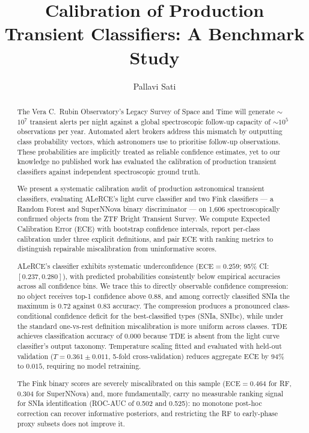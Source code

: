 \documentclass[twocolumn]{aastex631}
\begin{document}
\title{Calibration of Production Transient Classifiers: A Benchmark Study}

\author{Pallavi Sati}

\begin{abstract}
The Vera C.\ Rubin Observatory's Legacy Survey of Space and Time will 
generate $\sim$$10^7$ transient alerts per night against a global 
spectroscopic follow-up capacity of $\sim$$10^5$ observations per year. 
Automated alert brokers address this mismatch by outputting class
probability vectors, which astronomers use to prioritise follow-up
observations. These probabilities are implicitly treated as reliable
confidence estimates, yet to our knowledge no published work has
evaluated the calibration of production transient classifiers against
independent spectroscopic ground truth.

We present a systematic calibration audit of production
astronomical transient classifiers, evaluating ALeRCE's light curve
classifier and two Fink classifiers — a Random Forest and SuperNNova
binary discriminator — on 1,606 spectroscopically confirmed objects
from the ZTF Bright Transient Survey. We compute Expected Calibration
Error (ECE) with bootstrap confidence intervals, report per-class
calibration under three explicit definitions, and pair ECE with
ranking metrics to distinguish repairable miscalibration from
uninformative scores.

ALeRCE's classifier exhibits systematic underconfidence
($\mathrm{ECE} = 0.259$; 95\% CI: $[0.237, 0.280]$), with predicted
probabilities consistently below empirical accuracies across all
confidence bins. We trace this to directly observable confidence
compression: no object receives top-1 confidence above 0.88, and
among correctly classified SNIa the maximum is 0.72 against 0.83
accuracy. The compression produces a pronounced class-conditional
confidence deficit for the best-classified types (SNIa, SNIbc), while
under the standard one-vs-rest definition miscalibration is more
uniform across classes. TDE achieves classification accuracy of 0.000
because TDE is absent from the light curve classifier's output
taxonomy. Temperature scaling fitted and evaluated with held-out
validation ($T = 0.361 \pm 0.011$, 5-fold cross-validation) reduces
aggregate ECE by 94\% to $0.015$, requiring no model retraining.

The Fink binary scores are severely miscalibrated on this sample
($\mathrm{ECE} = 0.464$ for RF, $0.304$ for SuperNNova) and, more
fundamentally, carry no measurable ranking signal for SNIa
identification (ROC-AUC of 0.502 and 0.525): no monotone post-hoc
correction can recover informative posteriors, and restricting the RF
to early-phase proxy subsets does not improve it.


\end{abstract}
\end{document}
